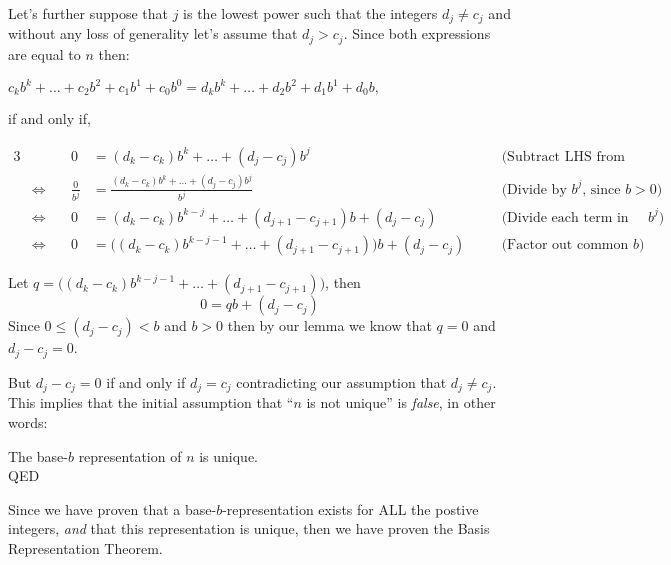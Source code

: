 \documentclass{article}
\begin{document}
Let's further suppose that $j$ is the lowest power such that the integers $d_j\ne{}c_j$ and without any loss of generality
let's assume that $d_j>c_j$. Since both expressions are equal to $n$ then:
\begin{center}
$c_kb^k+\dots+c_2b^2+c_1b^1+c_0b^0=d_kb^k+\dots+d_2b^2+d_1b^1+d_0b,$

\smallskip
if and only if,
\end{center}
{\small
\begin{alignat*}{3}
  &&0
  &= (d_k-c_k)b^k+\dots+(d_j-c_j)b^j&&\quad\text{(Subtract LHS from both sides)}\\
  &\Leftrightarrow\quad
  &\frac{0}{b^j}
  &= \frac{(d_k-c_k)b^k+\dots+(d_j-c_j)b^j}{b^j} &&\quad\text{(Divide by }b^j\text{, since }b>0\text{)}\\
  &\Leftrightarrow\quad
  &0
  &=(d_k-c_k)b^{k-j}+\dots+(d_{j+1}-c_{j+1})b+(d_j-c_j) &&\quad\text{(Divide each term in numerator by }b^j{)}\\
  &\Leftrightarrow\quad
  &0
  &= \big((d_k-c_k)b^{k-j-1}+\dots+(d_{j+1}-c_{j+1})\big)b+(d_j-c_j) &&\quad\text{(Factor out common }b{)}
\end{alignat*}
}

Let $q=\big((d_k-c_k)b^{k-j-1}+\dots+(d_{j+1}-c_{j+1})\big)$, then
\[0=qb+(d_j-c_j)\]
Since $0\le(d_j-c_j)<b$ and $b>0$ then by our lemma we know that
$q=0$ and $d_j-c_j = 0$.

But $d_j-c_j = 0$ if and only if $d_j = c_j$
contradicting our assumption that $d_j\ne{}c_j$. This implies that the initial assumption that ``$n$
is not unique'' is \emph{false}, in other words:
\begin{center}
The base-$b$ representation of $n$ is unique.\\
QED
\end{center}

\bigskip
Since we have proven that a base-$b$-representation exists for ALL the postive integers, \emph{and}
that this representation is unique, then we
have proven the Basis Representation Theorem.
\end{document}
